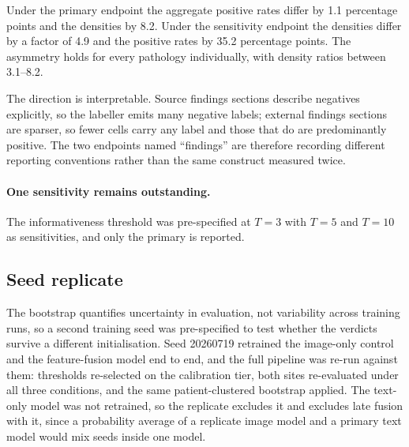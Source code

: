 Under the primary endpoint the aggregate positive rates differ by
\num{1.1} percentage points and the densities by \num{8.2}. Under the
sensitivity endpoint the densities differ by a factor of \num{4.9} and the
positive rates by \num{35.2} percentage points. The asymmetry holds for every
pathology individually, with density ratios between \numrange{3.1}{8.2}.

The direction is interpretable. Source findings sections describe negatives
explicitly, so the labeller emits many negative labels; external findings
sections are sparser, so fewer cells carry any label and those that do are
predominantly positive. The two endpoints named ``findings'' are therefore
recording different reporting conventions rather than the same construct
measured twice.

\paragraph{One sensitivity remains outstanding.} The informativeness threshold
was pre-specified at $T=3$ with $T=5$ and $T=10$ as sensitivities, and only the
primary is reported.

\subsection{Seed replicate}
\label{sec:seed-replicate}

The bootstrap quantifies uncertainty in evaluation, not variability across
training runs, so a second training seed was pre-specified to test whether the
verdicts survive a different initialisation. Seed \num{20260719} retrained the
image-only control and the feature-fusion model end to end, and the full
pipeline was re-run against them: thresholds re-selected on the calibration
tier, both sites re-evaluated under all three conditions, and the same
patient-clustered bootstrap applied. The text-only model was not retrained, so
the replicate excludes it and excludes late fusion with it, since a probability
average of a replicate image model and a primary text model would mix seeds
inside one model.

